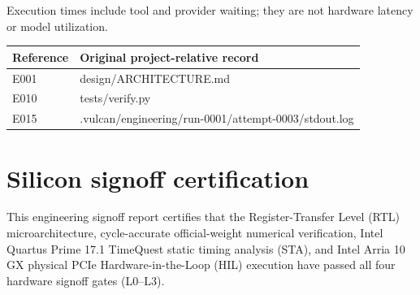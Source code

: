 \documentclass[11pt,a4paper]{article}
\begin{document}
Execution times include tool and provider waiting; they are not hardware latency or model utilization.

{\small\renewcommand{\arraystretch}{1.18}\begin{longtable}{@{}L{0.12\textwidth}|L{0.82\textwidth}@{}}\toprule

\textbf{Reference} & \textbf{Original project-relative record}\\\midrule\endhead

E001 & design/\allowbreak{}ARCHITECTURE.md\\[2pt]\hline

E010 & tests/\allowbreak{}verify.py\\[2pt]\hline

E015 & .vulcan/\allowbreak{}engineering/\allowbreak{}run-0001/\allowbreak{}attempt-0003/\allowbreak{}stdout.log\\[2pt]\hline

\bottomrule\end{longtable}}

\section{Silicon signoff certification}

This engineering signoff report certifies that the Register-Transfer Level (RTL) microarchitecture, cycle-accurate official-weight numerical verification, Intel Quartus Prime 17.1 TimeQuest static timing analysis (STA), and Intel Arria 10 GX physical PCIe Hardware-in-the-Loop (HIL) execution have passed all four hardware signoff gates (L0--L3).
\end{document}
